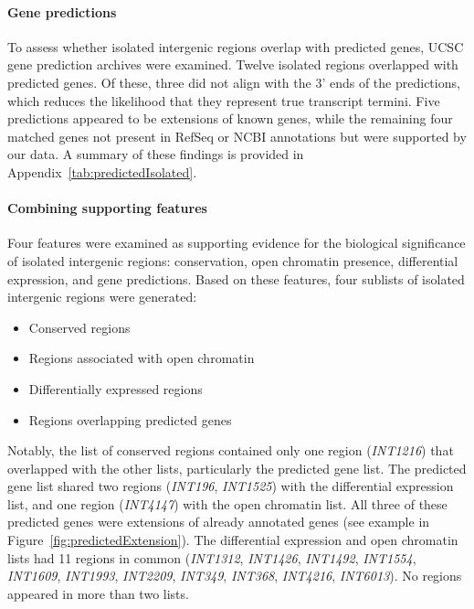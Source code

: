 \paragraph{Gene predictions}

To assess whether isolated intergenic regions overlap with predicted genes, UCSC gene prediction archives were examined.
Twelve isolated regions overlapped with predicted genes. Of these, three did not align with the 3' ends of the predictions,
which reduces the likelihood that they represent true transcript termini.
Five predictions appeared to be extensions of known genes,
while the remaining four matched genes not present in RefSeq or NCBI annotations but were supported by our data.
A summary of these findings is provided in Appendix~\ref{tab:predictedIsolated}.

\paragraph{Combining supporting features}

Four features were examined as supporting evidence for the biological significance of isolated intergenic regions:
conservation, open chromatin presence, differential expression, and gene predictions.
Based on these features, four sublists of isolated intergenic regions were generated:

\begin{itemize}
\item Conserved regions
\item Regions associated with open chromatin
\item Differentially expressed regions
\item Regions overlapping predicted genes
\end{itemize}

Notably, the list of conserved regions contained only one region (\textit{INT1216}) that overlapped with the other lists,
particularly the predicted gene list.
The predicted gene list shared two regions (\textit{INT196}, \textit{INT1525}) with the differential expression list,
and one region (\textit{INT4147}) with the open chromatin list.
All three of these predicted genes were extensions of already annotated genes
(see example in Figure~\ref{fig:predictedExtension}).
The differential expression and open chromatin lists had 11 regions in common
(\textit{INT1312}, \textit{INT1426}, \textit{INT1492}, \textit{INT1554}, \textit{INT1609}, \textit{INT1993}, \textit{INT2209}, \textit{INT349},
\textit{INT368}, \textit{INT4216}, \textit{INT6013}).
No regions appeared in more than two lists.

